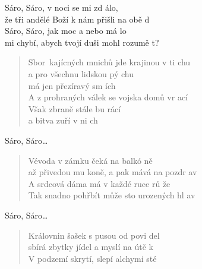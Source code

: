 \begin{song}{}
\begin{refren}
   Sáro, Sáro, v noci se mi zd álo, \\
   že tři andělé Boží k nám přišli na obě d \\
   Sáro, Sáro, jak moc a nebo má lo \\
   mi chybí, abych tvojí duši mohl rozumě t?
\end{refren}
\begin{verse}
   Sbor~kajícných mnichů jde krajinou v ti chu \\
   a pro všechnu lidskou pý chu \\
   má jen přezíravý sm ích \\
   A z prohraných válek se vojska domů vr ací \\
   Však zbraně stále bu rácí \\
   a bitva zuří v ni ch
\end{verse}
\begin{refren}
   Sáro, Sáro\ldots
\end{refren}
\begin{verse}
   Vévoda v zámku čeká na balkó ně \\
   až přivedou mu koně, a pak mává na pozdr av \\
   A srdcová dáma má v každé ruce rů že \\
   Tak snadno pohřbít může sto urozených hl av
\end{verse}
\begin{refren}
   Sáro, Sáro\ldots
\end{refren}
\begin{verse}
   Královnin šašek s pusou od povi del \\
   sbírá zbytky jídel a myslí na útě k \\
   V podzemí skrytí, slepí alchymi sté \\

\end{verse}
\end{song}
